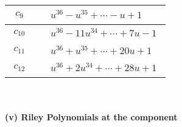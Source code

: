 \documentclass[1p]{elsarticle_modified}
\theoremstyle{definition}
\begin{document}
\begin{tabular}{m{50pt}|m{274pt}}
\hline $$\begin{aligned}c_{9}\end{aligned}$$&$\begin{aligned}
&u^{36}- u^{35}+\cdots- u+1
\end{aligned}$\\
\hline $$\begin{aligned}c_{10}\end{aligned}$$&$\begin{aligned}
&u^{36}-11 u^{34}+\cdots+7 u-1
\end{aligned}$\\
\hline $$\begin{aligned}c_{11}\end{aligned}$$&$\begin{aligned}
&u^{36}+u^{35}+\cdots+20 u+1
\end{aligned}$\\
\hline $$\begin{aligned}c_{12}\end{aligned}$$&$\begin{aligned}
&u^{36}+2 u^{34}+\cdots+28 u+1
\end{aligned}$\\
\hline
\end{tabular}\\~\\
\newpage\renewcommand{\arraystretch}{1}
\flushleft \textbf{(v) Riley Polynomials at the component}\newline \\
\end{document}
